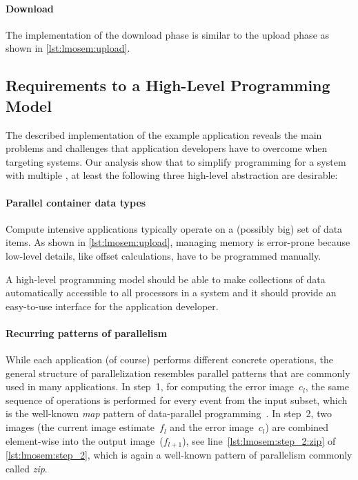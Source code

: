 \paragraph{Download}
The implementation of the download phase is similar to the upload phase as shown in \autoref{lst:lmosem:upload}.


\subsection{Requirements to a High-Level Programming Model}
\label{section:requirements}
The described implementation of the example application reveals the main problems and challenges that application developers have to overcome when targeting \GPU systems.
Our analysis show that to simplify programming for a system with multiple \GPUs, at least the following three high-level abstraction are desirable:

\paragraph{Parallel container data types}
Compute intensive applications typically operate on a (possibly big) set of data items.
As shown in \autoref{lst:lmosem:upload}, managing memory is error-prone because low-level details, like offset calculations, have to be programmed manually.

A high-level programming model should be able to make collections of data automatically accessible to all processors in a system and it should provide an easy-to-use interface for the application developer.

\paragraph{Recurring patterns of parallelism}
While each application (of course) performs different concrete operations, the general structure of parallelization resembles parallel patterns that are commonly used in many applications.
In step~1, for computing the error image~$c_l$, the same sequence of operations is performed for every event from the input subset, which is the well-known \emph{map} pattern of data-parallel programming~\cite{GorlatchCo2011}.
In step~2, two images (the current image estimate~$f_l$ and the error image~$c_l$) are combined element-wise into the output image~($f_{l+1}$), see line~\autoref{lst:lmosem:step_2:zip} of \autoref{lst:lmosem:step_2}, which is again a well-known pattern of parallelism commonly called \emph{zip}.


